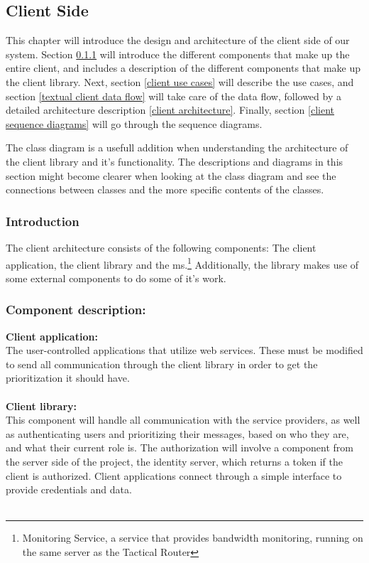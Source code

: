 \subsection{Client Side}\label{client side}

This chapter will introduce the design and architecture of the client side of our system. Section \ref{client introduction} will introduce the different components that make up the entire client, and includes a description of the different components that make up the client library. Next, section \ref{client use cases} will describe the use cases, and section \ref{textual client data flow} will take care of the data flow, followed by a detailed architecture description \ref{client architecture}. Finally, section \ref{client sequence diagrams} will go through the sequence diagrams.
    
    The class diagram is a usefull addition when understanding the architecture of the client library and it's functionality. The descriptions and diagrams in this section might become clearer when looking at the class diagram and see the connections between classes and the more specific contents of the classes. 
		
    \subsubsection{Introduction}\label{client introduction}
The client architecture consists of the following components: The client application, the client library and the \gls{ms}.\footnote{Monitoring Service, a service that provides bandwidth monitoring, running on the same server as the Tactical Router} Additionally, the library makes use of some external components to do some of it's work.

    \subsubsection{Component description:}\label{Component description}

\indent \indent \textbf{Client application:}\\
	The user-controlled applications that utilize web services. These must be modified to send all communication through the client library in order to get the prioritization it should have.
\\\\

\indent \textbf{Client library:}\\
This component will handle all communication with the service providers, as well as authenticating users and prioritizing their messages, based on who they are, and what their current role is. The authorization will involve a component from the server side of the project, the identity server, which returns a token if the client is authorized. Client applications connect through a simple interface to provide credentials and data.
\\\\ 

